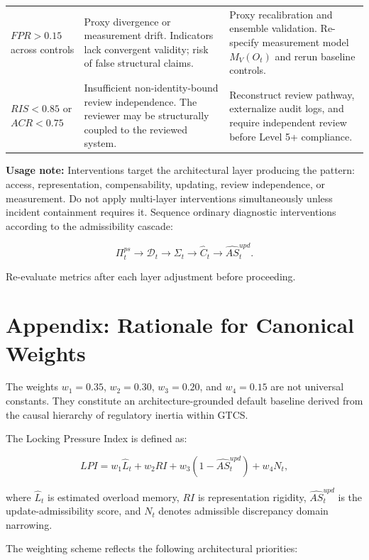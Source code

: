 \documentclass[11pt,a4paper]{article}
\theoremstyle{breakstyle}
\newcommand{\Dadm}{\mathcal{D}}
\newcommand{\Sig}{\Sigma}
\newcommand{\Chat}{\widehat{C}}
\newcommand{\Lhat}{\widehat{L}}
\begin{document}
\begin{table}[h!]
\begin{tabular}{@{}p{4.0cm}p{4.4cm}p{4.8cm}@{}}
			$FPR > 0.15$ across controls
			&
			Proxy divergence or measurement drift. Indicators lack convergent validity; risk of false structural claims.
			&
			Proxy recalibration and ensemble validation. Re-specify measurement model $M_V(O_t)$ and rerun baseline controls.
			\\
			\addlinespace
			
			$RIS < 0.85$ or $ACR < 0.75$
			&
			Insufficient non-identity-bound review independence. The reviewer may be structurally coupled to the reviewed system.
			&
			Reconstruct review pathway, externalize audit logs, and require independent review before Level 5+ compliance.
			\\
			
			\bottomrule
		\end{tabular}
	\end{table}
	
	\textbf{Usage note:} Interventions target the architectural layer producing the pattern: access, representation, compensability, updating, review independence, or measurement. Do not apply multi-layer interventions simultaneously unless incident containment requires it. Sequence ordinary diagnostic interventions according to the admissibility cascade:
	
	\[
	\Pi^{ps}_t
	\rightarrow
	\Dadm_t
	\rightarrow
	\Sig_t
	\rightarrow
	\Chat_t
	\rightarrow
	\widehat{AS}^{upd}_t.
	\]
	
	Re-evaluate metrics after each layer adjustment before proceeding.
	
	\section*{Appendix: Rationale for Canonical Weights}
	
	The weights $w_1=0.35$, $w_2=0.30$, $w_3=0.20$, and $w_4=0.15$ are not universal constants. They constitute an architecture-grounded default baseline derived from the causal hierarchy of regulatory inertia within GTCS.
	
	The Locking Pressure Index is defined as:
	
	\[
	LPI =
	w_1 \Lhat_t
	+
	w_2 RI
	+
	w_3(1-\widehat{AS}^{upd}_t)
	+
	w_4 N_t,
	\]
	
	where $\Lhat_t$ is estimated overload memory, $RI$ is representation rigidity, $\widehat{AS}^{upd}_t$ is the update-admissibility score, and $N_t$ denotes admissible discrepancy domain narrowing.
	
	The weighting scheme reflects the following architectural priorities:
	
\end{document}
